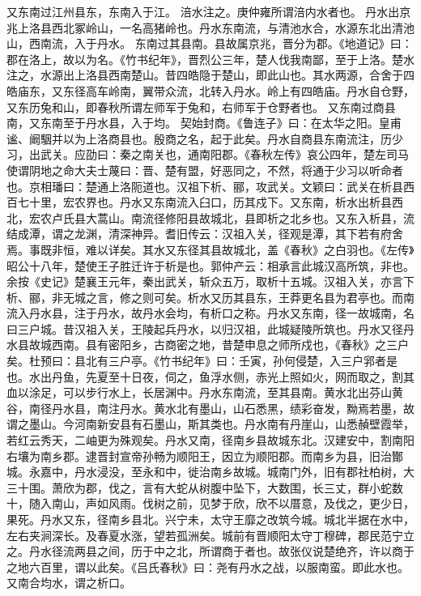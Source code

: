 \documentclass[12pt,UTF8]{ctexbook}
\begin{document}
又东南过江州县东，东南入于江。
涪水注之。庚仲雍所谓涪内水者也。
丹水出京兆上洛县西北冢岭山，一名高猪岭也。丹水东南流，与清池水合，水源东北出清池山，西南流，入于丹水。
东南过其县南。县故属京兆，晋分为郡。《地道记》曰：郡在洛上，故以为名。《竹书纪年》，晋烈公三年，楚人伐我南鄙，至于上洛。楚水注之，水源出上洛县西南楚山。昔四皓隐于楚山，即此山也。其水两源，合舍于四皓庙东，又东径高车岭南，翼带众流，北转入丹水。岭上有四皓庙。丹水自仓野，又东历兔和山，即春秋所谓左师军于兔和，右师军于仓野者也。
又东南过商县南，又东南至于丹水县，入于均。
契始封商。《鲁连子》曰：在太华之阳。皇甫谧、阚駰并以为上洛商县也。殷商之名，起于此矣。丹水自商县东南流注，历少习，出武关。应劭曰：秦之南关也，通南阳郡。《春秋左传》哀公四年，楚左司马使谓阴地之命大夫士蔑曰：晋、楚有盟，好恶同之，不然，将通于少习以听命者也。京相璠曰：楚通上洛阨道也。汉祖下析、郦，攻武关。文颖曰：武关在析县西百七十里，宏农界也。丹水又东南流入臼口，历其戍下。又东南，析水出析县西北，宏农卢氏县大蒿山。南流径修阳县故城北，县即析之北乡也。又东入析县，流结成潭，谓之龙渊，清深神异。耆旧传云：汉祖入关，径观是潭，其下若有府舍焉。事既非恒，难以详矣。其水又东径其县故城北，盖《春秋》之白羽也。《左传》昭公十八年，楚使王子胜迁许于析是也。郭仲产云：相承言此城汉高所筑，非也。余按《史记》楚襄王元年，秦出武关，斩众五万，取析十五城。汉祖入关，亦言下析、郦，非无城之言，修之则可矣。析水又历其县东，王莽更名县为君亭也。而南流入丹水县，注于丹水，故丹水会均，有析口之称。丹水又东南，径一故城南，名曰三户城。昔汉祖入关，王陵起兵丹水，以归汉祖，此城疑陵所筑也。丹水又径丹水县故城西南。县有密阳乡，古商密之地，昔楚申息之师所戍也，《春秋》之三户矣。杜预曰：县北有三户亭。《竹书纪年》曰：壬寅，孙何侵楚，入三户郛者是也。水出丹鱼，先夏至十日夜，伺之，鱼浮水侧，赤光上照如火，网而取之，割其血以涂足，可以步行水上，长居渊中。丹水东南流，至其县南。黄水北出芬山黄谷，南径丹水县，南注丹水。黄水北有墨山，山石悉黑，绩彩奋发，黝焉若墨，故谓之墨山。今河南新安县有石墨山，斯其类也。丹水南有丹崖山，山悉赬壁霞举，若红云秀天，二岫更为殊观矣。丹水又南，径南乡县故城东北。汉建安中，割南阳右壤为南乡郡。逮晋封宣帝孙畅为顺阳王，因立为顺阳郡。而南乡为县，旧治酇城。永嘉中，丹水浸没，至永和中，徙治南乡故城。城南门外，旧有郡社柏树，大三十围。萧欣为郡，伐之，言有大蛇从树腹中坠下，大数围，长三丈，群小蛇数十，随入南山，声如风雨。伐树之前，见梦于欣，欣不以厝意，及伐之，更少日，果死。丹水又东，径南乡县北。兴宁未，太守王靡之改筑今城。城北半据在水中，左右夹涧深长。及春夏水涨，望若孤洲矣。城前有晋顺阳太守丁穆碑，郡民范宁立之。丹水径流两县之间，历于中之北，所谓商于者也。故张仪说楚绝齐，许以商于之地六百里，谓以此矣。《吕氏春秋》曰：尧有丹水之战，以服南蛮。即此水也。又南合均水，谓之析口。
\end{document}
